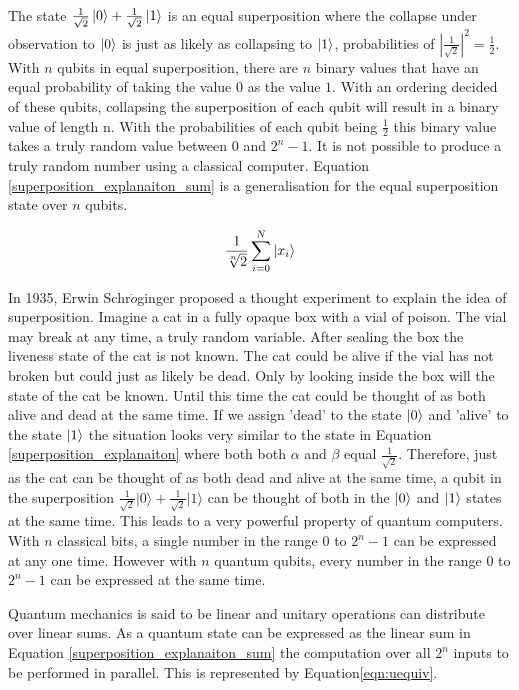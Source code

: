 The state $\frac{1}{\sqrt{2}}\left\vert{0}\right\rangle+\frac{1}{\sqrt{2}}\left\vert{1}\right\rangle$ is an equal superposition where the collapse under observation to $\left\vert{0}\right\rangle$ is just as likely as collapsing to $\left\vert{1}\right\rangle$, probabilities of $|\frac{1}{\sqrt{2}}|^2=\frac{1}{2}$.
With $n$ qubits in equal superposition, there are $n$ binary values that have an equal probability of taking the value $0$ as the value $1$.
With an ordering decided of these qubits, collapsing the superposition of each qubit will result in a binary value of length n.
With the probabilities of each qubit being $\frac{1}{2}$ this binary value takes a truly random value between $0$ and $2^n-1$.
It is not possible to produce a truly random number using a classical computer.
Equation \ref{superposition_explanaiton_sum} is a generalisation for the equal superposition state over $n$ qubits.

\begin{equation}
\label{superposition_explanaiton_sum}
\frac{1}{\sqrt[n]{2}}\sum\limits_{i=0}^N \left\vert{x_i}\right\rangle
\end{equation}

In 1935, Erwin Schr$\ddot{o}$ginger\cite{SchroedingersCat} proposed a thought experiment to explain the idea of superposition.
Imagine a cat in a fully opaque box with a vial of poison.
The vial may break at any time, a truly random variable.
After sealing the box the liveness state of the cat is not known.
The cat could be alive if the vial has not broken but could just as likely be dead.
Only by looking inside the box will the state of the cat be known.
Until this time the cat could be thought of as both alive and dead at the same time.
If we assign 'dead' to the state $\left\vert{0}\right\rangle$ and 'alive' to the state $\left\vert{1}\right\rangle$ the situation looks very similar to the state in Equation \ref{superposition_explanaiton} where both both $\alpha$ and $\beta$ equal $\frac{1}{\sqrt{2}}$.
Therefore, just as the cat can be thought of as both dead and alive at the same time, a qubit in the superposition $\frac{1}{\sqrt{2}}\vert0\rangle+\frac{1}{\sqrt{2}}\vert1\rangle$ can be thought of both in the $\left\vert{0}\right\rangle$ and $\left\vert{1}\right\rangle$ states at the same time.
This leads to a very powerful property of quantum computers.
With $n$ classical bits, a single number in the range $0$ to $2^n-1$ can be expressed at any one time.
However with $n$ quantum qubits, every number in the range $0$ to $2^n-1$ can be expressed at the same time.

Quantum mechanics is said to be linear and unitary operations can distribute over linear sums.
As a quantum state can be expressed as the linear sum in Equation \ref{superposition_explanaiton_sum} the computation over all $2^n$ inputs to be performed in parallel.
This is represented by Equation\ref{eqn:uequiv}.%

